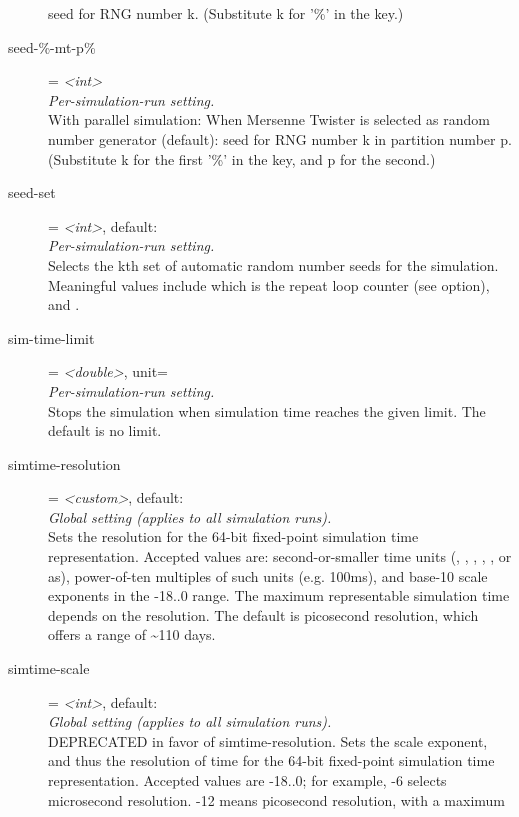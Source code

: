 \begin{description}
    seed for RNG number k. (Substitute k for '\%' in the key.)
\item[seed-\%-mt-p\%] = \textit{<int>}\\
    \textit{Per-simulation-run setting.}\\
    With parallel simulation: When Mersenne Twister is selected as random
    number generator (default): seed for RNG number k in partition number p.
    (Substitute k for the first '\%' in the key, and p for the second.)
\item[seed-set] = \textit{<int>}, default: \\
    \textit{Per-simulation-run setting.}\\
    Selects the kth set of automatic random number seeds for the simulation.
    Meaningful values include 
    which is the repeat loop counter (see  option), and
    .
\item[sim-time-limit] = \textit{<double>}, unit=\\
    \textit{Per-simulation-run setting.}\\
    Stops the simulation when simulation time reaches the given limit. The
    default is no limit.
\item[simtime-resolution] = \textit{<custom>}, default: \\
    \textit{Global setting (applies to all simulation runs).}\\
    Sets the resolution for the 64-bit fixed-point simulation time
    representation. Accepted values are: second-or-smaller time units (,
    , , , ,  or as), power-of-ten
    multiples of such units (e.g. 100ms), and base-10 scale exponents in the
    -18..0 range. The maximum representable simulation time depends on the
    resolution. The default is picosecond resolution, which offers a range of
    {\textasciitilde}110 days.
\item[simtime-scale] = \textit{<int>}, default: \\
    \textit{Global setting (applies to all simulation runs).}\\
    DEPRECATED in favor of simtime-resolution. Sets the scale exponent, and
    thus the resolution of time for the 64-bit fixed-point simulation time
    representation. Accepted values are -18..0; for example, -6 selects
    microsecond resolution. -12 means picosecond resolution, with a maximum

\end{description}
